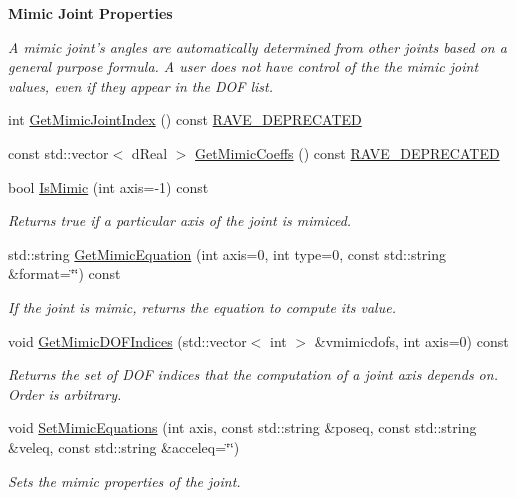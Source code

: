 \begin{Indent}{\bf Mimic Joint Properties}\par
{\em \label{_amgrp1f53e0c18272c66ca8f8cfdf88a1931d}
 A mimic joint's angles are automatically determined from other joints based on a general purpose formula. A user does not have control of the the mimic joint values, even if they appear in the DOF list. }\begin{DoxyCompactItemize}
\item 
int \hyperlink{classOpenRAVE_1_1KinBody_1_1Joint_a5dc0e9a767787813d561165fbaf5a1ea}{GetMimicJointIndex} () const \hyperlink{namespaceOpenRAVE_af23fc4c2c72950a8c02f38ef71680bc6}{RAVE\_\-DEPRECATED}
\item 
const std::vector$<$ dReal $>$ \hyperlink{classOpenRAVE_1_1KinBody_1_1Joint_a23d3a787036ec4661af61c5c0f0a60b2}{GetMimicCoeffs} () const \hyperlink{namespaceOpenRAVE_af23fc4c2c72950a8c02f38ef71680bc6}{RAVE\_\-DEPRECATED}
\item 
bool \hyperlink{classOpenRAVE_1_1KinBody_1_1Joint_ac8d727c6f970d30c4cdea02ce2a153bc}{IsMimic} (int axis=-\/1) const 
\begin{DoxyCompactList}\small\item\em Returns true if a particular axis of the joint is mimiced. \item\end{DoxyCompactList}\item 
std::string \hyperlink{classOpenRAVE_1_1KinBody_1_1Joint_a8bc8323e310011f33ac609500db780c3}{GetMimicEquation} (int axis=0, int type=0, const std::string \&format=\char`\"{}\char`\"{}) const 
\begin{DoxyCompactList}\small\item\em If the joint is mimic, returns the equation to compute its value. \item\end{DoxyCompactList}\item 
void \hyperlink{classOpenRAVE_1_1KinBody_1_1Joint_acd2c27958f0bbd536ee752b237cbb514}{GetMimicDOFIndices} (std::vector$<$ int $>$ \&vmimicdofs, int axis=0) const 
\begin{DoxyCompactList}\small\item\em Returns the set of DOF indices that the computation of a joint axis depends on. Order is arbitrary. \item\end{DoxyCompactList}\item 
void \hyperlink{classOpenRAVE_1_1KinBody_1_1Joint_a0e31c5be31c4145afa786e0c0d6a46ae}{SetMimicEquations} (int axis, const std::string \&poseq, const std::string \&veleq, const std::string \&acceleq=\char`\"{}\char`\"{})
\begin{DoxyCompactList}\small\item\em Sets the mimic properties of the joint. \item\end{DoxyCompactList}\end{DoxyCompactItemize}
\end{Indent}
